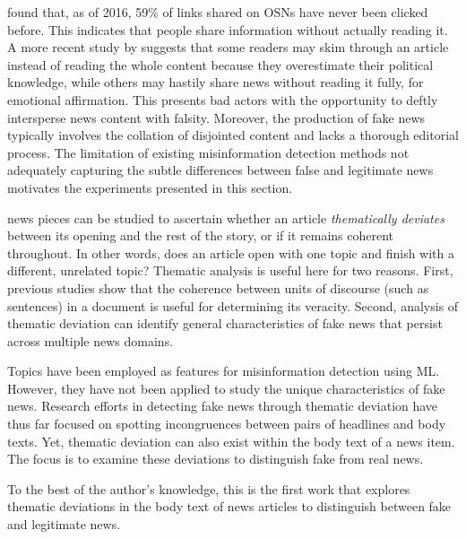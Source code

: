   found that, as of 2016, 59\% of links shared on OSNs have never been clicked before. This indicates that people share information without actually reading it. A more recent study by  suggests that some readers may skim through an article instead of reading the whole content because they overestimate their political knowledge, while others may hastily share news without reading it fully, for emotional affirmation. This presents bad actors with the opportunity to deftly intersperse news content with falsity. Moreover, the production of fake news typically involves the collation of disjointed content and lacks a thorough editorial process. The limitation of existing misinformation detection methods not adequately capturing the subtle differences between false and legitimate news motivates the experiments presented in this section.

 news pieces can be studied to ascertain whether an article \emph{thematically deviates} between its opening and the rest of the story, or if it remains coherent throughout. In other words, does an article open with one topic and finish with a different, unrelated topic? Thematic analysis is useful here for two reasons. First, previous studies show that the coherence between units of discourse (such as sentences) in a document is useful for determining its veracity. Second, analysis of thematic deviation can identify general characteristics of fake news that persist across multiple news domains.

Topics have been employed as features for misinformation detection using \ac{ML}. However, they have not been applied to study the unique characteristics of fake news. Research efforts in detecting fake news through thematic deviation have thus far focused on spotting incongruences between pairs of headlines and body texts. Yet, thematic deviation can also exist within the body text of a news item. The focus is to examine these deviations to distinguish fake from real news.

To the best of the author's knowledge, this is the first work that explores thematic deviations in the body text of news articles to distinguish between fake and legitimate news.

